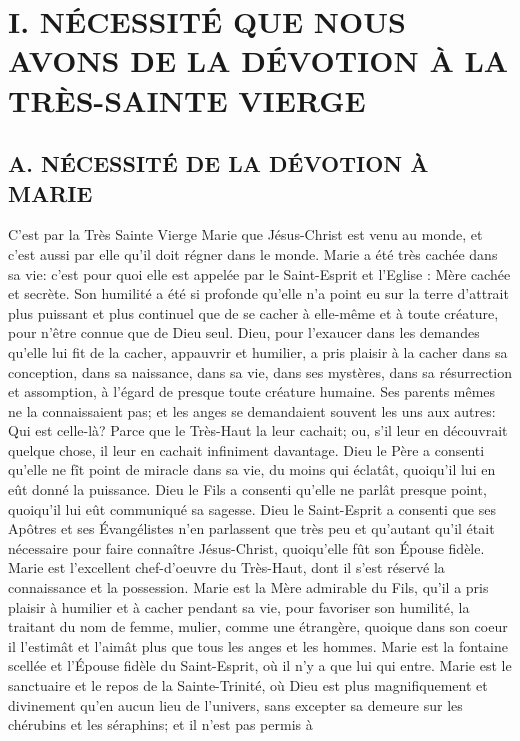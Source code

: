 \section{I. NÉCESSITÉ QUE NOUS AVONS DE LA DÉVOTION À LA TRÈS-SAINTE VIERGE}
\subsection{A. NÉCESSITÉ DE LA DÉVOTION À MARIE}
 C'est par la Très Sainte Vierge Marie que Jésus-Christ est venu au monde, et c'est aussi par elle qu'il doit
régner dans le monde.
 Marie a été très cachée dans sa vie: c'est pour quoi elle est appelée par le Saint-Esprit et l'Eglise :
Mère cachée et secrète. Son humilité a été si profonde qu'elle n'a point eu sur la terre d'attrait plus puissant et plus
continuel que de se cacher à elle-même et à toute créature, pour n'être connue que de Dieu seul.
 Dieu, pour l'exaucer dans les demandes qu'elle lui fit de la cacher, appauvrir et humilier, a pris plaisir à la
cacher dans sa conception, dans sa naissance, dans sa vie, dans ses mystères, dans sa résurrection et
assomption, à l'égard de presque toute créature humaine. Ses parents mêmes ne la connaissaient pas; et les
anges se demandaient souvent les uns aux autres:  Qui est celle-là? Parce que le Très-Haut la leur
cachait; ou, s'il leur en découvrait quelque chose, il leur en cachait infiniment davantage.
 Dieu le Père a consenti qu'elle ne fît point de miracle dans sa vie, du moins qui éclatât, quoiqu'il lui en eût
donné la puissance. Dieu le Fils a consenti qu'elle ne parlât presque point, quoiqu'il lui eût communiqué sa
sagesse. Dieu le Saint-Esprit a consenti que ses Apôtres et ses Évangélistes n'en parlassent que très peu et
qu'autant qu'il était nécessaire pour faire connaître Jésus-Christ, quoiqu'elle fût son Épouse fidèle.
 Marie est l'excellent chef-d'oeuvre du Très-Haut, dont il s'est réservé la connaissance et la possession. Marie
est la Mère admirable du Fils, qu'il a pris plaisir à humilier et à cacher pendant sa vie, pour favoriser son humilité,
la traitant du nom de femme, mulier, comme une étrangère, quoique dans son coeur il l'estimât et l'aimât plus que
tous les anges et les hommes. Marie est la fontaine scellée et l'Épouse fidèle du Saint-Esprit, où il n'y a que lui qui
entre. Marie est le sanctuaire et le repos de la Sainte-Trinité, où Dieu est plus magnifiquement et divinement qu'en
aucun lieu de l'univers, sans excepter sa demeure sur les chérubins et les séraphins; et il n'est pas permis à

